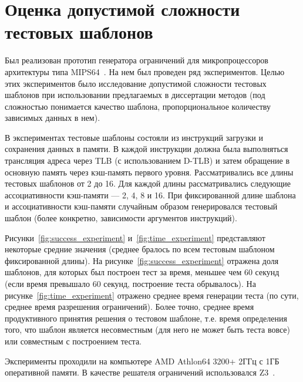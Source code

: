 \documentclass[14pt]{extreport}
\begin{document}
\section{Оценка допустимой сложности тестовых шаблонов}


Был реализован прототип генератора ограничений для микропроцессоров архитектуры типа MIPS64~\cite{mips64_II}. На нем был проведен ряд экспериментов. Целью этих экспериментов было исследование допустимой сложности тестовых шаблонов при использовании предлагаемых в диссертации методов (под сложностью понимается качество шаблона, пропорциональное количеству зависимых данных в нем). 

В экспериментах тестовые шаблоны состояли из инструкций загрузки и сохранения данных в памяти. В каждой инструкции должна была выполняться трансляция адреса через TLB (с использованием D-TLB) и затем обращение в основную память через кэш-память первого уровня. Рассматривались все длины тестовых шаблонов от 2 до 16. Для каждой длины рассматривались следующие ассоциативности кэш-памяти --- 2, 4, 8 и 16. При фиксированной длине шаблона и ассоциативности кэш-памяти случайным образом генерировался тестовый шаблон (более конкретно, зависимости аргументов инструкций).

Рисунки~\ref{fig:success_experiment} и~\ref{fig:time_experiment} представляют некоторые средние значения (среднее бралось по всем тестовым шаблоном фиксированной длины). На рисунке~\ref{fig:success_experiment} отражена доля шаблонов, для которых был построен тест за время, меньшее чем 60 секунд (если время превышало 60 секунд, построение теста обрывалось). На рисунке~\ref{fig:time_experiment} отражено среднее время генерации теста (по сути, среднее время разрешения ограничений). Более точно, среднее время продуктивного принятия решения о тестовом шаблоне, т.е. время определения того, что шаблон является несовместным (для него не может быть теста вовсе) или совместным с построением теста.

Эксперименты проходили на компьютере AMD Athlon64 3200+ 2ГГц с 1ГБ оперативной памяти. В качестве решателя ограничений использовался Z3~\cite{Z3}.
\end{document}

